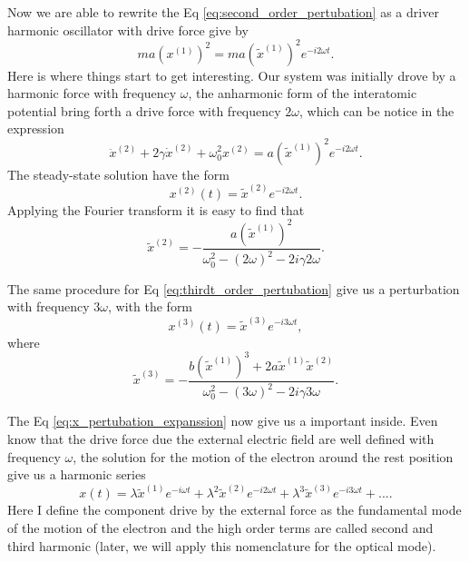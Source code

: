 Now we are able to rewrite the Eq \ref{eq:second_order_pertubation} as a driver harmonic oscillator with drive force give by 
\begin{equation}
    ma\left(x^{(1)}\right)^2 = ma\left(\tilde{x}^{(1)}\right)^2e^{-i2\omega t}.
\end{equation}
Here is where things start to get interesting. Our system was initially drove by a harmonic force with frequency $\omega$, the anharmonic form of the interatomic potential bring forth a drive force with frequency $2\omega$, which can be notice in the expression
\begin{equation}
    \ddot{x}^{(2)} + 2\gamma\dot{x}^{(2)} + \omega_0^2x^{(2)} = a\left(\tilde{x}^{(1)}\right)^2e^{-i2\omega t}.
\end{equation}
The steady-state solution have the form
\begin{equation}
    x^{(2)}(t) = \tilde{x}^{(2)}e^{-i2\omega t}.
\end{equation}
Applying the Fourier transform it is easy to find that
\begin{equation}
    \tilde{x}^{(2)} = -\frac{a\left(\tilde{x}^{(1)}\right)^2}{\omega_0^2 - (2\omega)^2-2i\gamma2\omega}.
\end{equation}

The same procedure for Eq \ref{eq:thirdt_order_pertubation} give us a perturbation with frequency $3\omega$, with the form 
\begin{equation}
    x^{(3)}(t) = \tilde{x}^{(3)}e^{-i3\omega t},
\end{equation}
where
\begin{equation}
    \tilde{x}^{(3)} = -\frac{b\left(\tilde{x}^{(1)}\right)^3 + 2 a \tilde{x}^{(1)}\tilde{x}^{(2)}}{\omega_0^2 - (3\omega)^2-2i\gamma3\omega}.
\end{equation}

The Eq \ref{eq:x_pertubation_expanssion} now give us a important inside. Even know that the drive force due the external electric field are well defined with frequency $\omega$, the solution for the motion of the electron around the rest position give us a harmonic series
\begin{equation}
    x(t) = \lambda \tilde{x}^{(1)}e^{-i\omega t} + \lambda^2 \tilde{x}^{(2)}e^{-i2\omega t} + \lambda^3 \tilde{x}^{(3)}e^{-i3\omega t} +....
\end{equation}
Here I define the component drive by the external force as the fundamental mode of the motion of the electron and the high order terms are called second and third harmonic (later, we will apply this nomenclature for the optical mode).  

